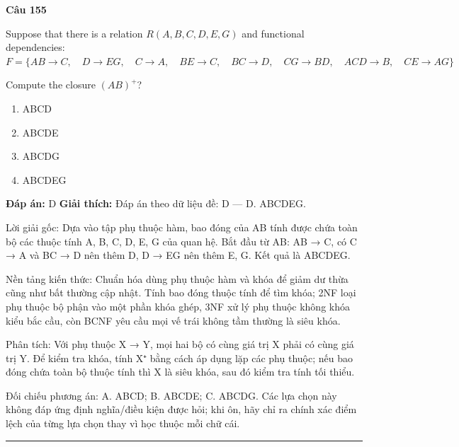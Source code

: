 \documentclass[11pt,a4paper]{article}
\newenvironment{question}[1]{%
  \par\vspace{1em}\noindent\textbf{\large Câu #1}\par\vspace{0.4em}
}{%
  \par\vspace{1em}\hrule\vspace{0.6em}
}
\newenvironment{choices}{%
  \begin{enumerate}[label=\textbf{\Alph*.},leftmargin=2.2em,itemsep=2pt,topsep=3pt]
}{%
  \end{enumerate}
}
\newcommand{\choice}{\item}
\begin{document}
\begin{question}{155}
Suppose that there is a relation \(R(A, B, C, D, E, G)\) and functional dependencies:
\(F = \{ AB \rightarrow C, \quad D \rightarrow EG, \quad C \rightarrow A, \quad BE \rightarrow C, \quad BC \rightarrow D, \quad CG \rightarrow BD, \quad ACD \rightarrow B, \quad CE \rightarrow AG \}\)

Compute the closure \((AB)^+\)?
\begin{choices}
\choice ABCD
\choice ABCDE
\choice ABCDG
\choice ABCDEG
\end{choices}
\textbf{Đáp án:} D
\textbf{Giải thích:} Đáp án theo dữ liệu đề: D — D. ABCDEG.

Lời giải gốc: Dựa vào tập phụ thuộc hàm, bao đóng của AB tính được chứa toàn bộ các thuộc tính A, B, C, D, E, G của quan hệ. Bắt đầu từ AB: AB → C, có C → A và BC → D nên thêm D, D → EG nên thêm E, G. Kết quả là ABCDEG.

Nền tảng kiến thức: Chuẩn hóa dùng phụ thuộc hàm và khóa để giảm dư thừa cũng như bất thường cập nhật. Tính bao đóng thuộc tính để tìm khóa; 2NF loại phụ thuộc bộ phận vào một phần khóa ghép, 3NF xử lý phụ thuộc không khóa kiểu bắc cầu, còn BCNF yêu cầu mọi vế trái không tầm thường là siêu khóa.

Phân tích: Với phụ thuộc X → Y, mọi hai bộ có cùng giá trị X phải có cùng giá trị Y. Để kiểm tra khóa, tính X⁺ bằng cách áp dụng lặp các phụ thuộc; nếu bao đóng chứa toàn bộ thuộc tính thì X là siêu khóa, sau đó kiểm tra tính tối thiểu.

Đối chiếu phương án: A. ABCD; B. ABCDE; C. ABCDG. Các lựa chọn này không đáp ứng định nghĩa/điều kiện được hỏi; khi ôn, hãy chỉ ra chính xác điểm lệch của từng lựa chọn thay vì học thuộc mỗi chữ cái.
\end{question}
\end{document}
